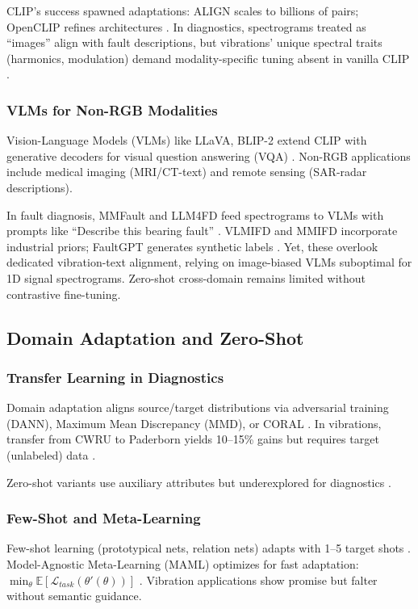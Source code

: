 CLIP's success spawned adaptations: ALIGN scales to billions of pairs; OpenCLIP refines architectures \cite{li2023align,jia2021scaling}. In diagnostics, spectrograms treated as ``images'' align with fault descriptions, but vibrations' unique spectral traits (harmonics, modulation) demand modality-specific tuning absent in vanilla CLIP \cite{kim2025llmzs}.

\subsubsection{VLMs for Non-RGB Modalities}
Vision-Language Models (VLMs) like LLaVA, BLIP-2 extend CLIP with generative decoders for visual question answering (VQA) \cite{liu2023llava}. Non-RGB applications include medical imaging (MRI/CT-text) and remote sensing (SAR-radar descriptions).

In fault diagnosis, MMFault and LLM4FD feed spectrograms to VLMs with prompts like ``Describe this bearing fault'' \cite{zhang2024mmfault,li2024llm4fd}. VLMIFD and MMIFD incorporate industrial priors; FaultGPT generates synthetic labels \cite{zhao2025vlmifd,xu2025mmifd,liu2024faultgpt}. Yet, these overlook dedicated vibration-text alignment, relying on image-biased VLMs suboptimal for 1D signal spectrograms. Zero-shot cross-domain remains limited without contrastive fine-tuning.

\subsection{Domain Adaptation and Zero-Shot}
\subsubsection{Transfer Learning in Diagnostics}
Domain adaptation aligns source/target distributions via adversarial training (DANN), Maximum Mean Discrepancy (MMD), or CORAL \cite{qiao2022grl,li2021mmd,wen2020domain}. In vibrations, transfer from CWRU to Paderborn yields 10--15\% gains but requires target (unlabeled) data \cite{wang2020transfer}.

Zero-shot variants use auxiliary attributes but underexplored for diagnostics \cite{chen2023gzsl}.

\subsubsection{Few-Shot and Meta-Learning}
Few-shot learning (prototypical nets, relation nets) adapts with 1--5 target shots \cite{hoang2023vit}. Model-Agnostic Meta-Learning (MAML) optimizes for fast adaptation: $\min_\theta \mathbb{E} [\mathcal{L}_{task}(\theta'(\theta))]$ \cite{wen2022maml}. Vibration applications show promise but falter without semantic guidance.

